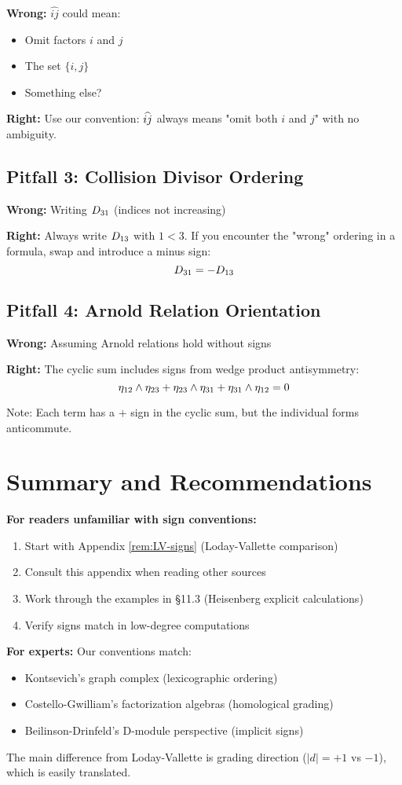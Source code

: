 \textbf{Wrong:} $\widehat{ij}$ could mean:
\begin{itemize}
\item Omit factors $i$ and $j$
\item The set $\{i, j\}$
\item Something else?
\end{itemize}

\textbf{Right:} Use our convention: $\widehat{ij}$ always means "omit both $i$ and $j$" with no ambiguity.

\subsection{Pitfall 3: Collision Divisor Ordering}

\textbf{Wrong:} Writing $D_{31}$ (indices not increasing)

\textbf{Right:} Always write $D_{13}$ with $1 < 3$. If you encounter the "wrong" ordering in a formula, swap and introduce a minus sign:
$$D_{31} = -D_{13}$$

\subsection{Pitfall 4: Arnold Relation Orientation}

\textbf{Wrong:} Assuming Arnold relations hold without signs

\textbf{Right:} The cyclic sum includes signs from wedge product antisymmetry:
$$\eta_{12} \wedge \eta_{23} + \eta_{23} \wedge \eta_{31} + \eta_{31} \wedge \eta_{12} = 0$$

Note: Each term has a $+$ sign in the cyclic sum, but the individual forms anticommute.

\section{Summary and Recommendations}

\textbf{For readers unfamiliar with sign conventions:}
\begin{enumerate}
\item Start with Appendix \ref{rem:LV-signs} (Loday-Vallette comparison)
\item Consult this appendix when reading other sources
\item Work through the examples in \S 11.3 (Heisenberg explicit calculations)
\item Verify signs match in low-degree computations
\end{enumerate}

\textbf{For experts:}
Our conventions match:
\begin{itemize}
\item Kontsevich's graph complex (lexicographic ordering)
\item Costello-Gwilliam's factorization algebras (homological grading)
\item Beilinson-Drinfeld's D-module perspective (implicit signs)
\end{itemize}

The main difference from Loday-Vallette is grading direction ($|d| = +1$ vs $-1$), which is easily translated.

